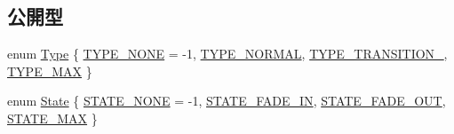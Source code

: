 \subsection*{公開型}
\begin{DoxyCompactItemize}
\item 
enum \mbox{\hyperlink{class_fade_ac06f27215b454aa05b93c236476d6e80}{Type}} \{ \mbox{\hyperlink{class_fade_ac06f27215b454aa05b93c236476d6e80aff416f0a20b074a38a4f67e20f001828}{T\+Y\+P\+E\+\_\+\+N\+O\+NE}} = -\/1, 
\mbox{\hyperlink{class_fade_ac06f27215b454aa05b93c236476d6e80a6058f5db637853756ba18166da96043e}{T\+Y\+P\+E\+\_\+\+N\+O\+R\+M\+AL}}, 
\mbox{\hyperlink{class_fade_ac06f27215b454aa05b93c236476d6e80af424897abd4b53f7af0bf51f1190a427}{T\+Y\+P\+E\+\_\+\+T\+R\+A\+N\+S\+I\+T\+I\+O\+N\+\_}}, 
\mbox{\hyperlink{class_fade_ac06f27215b454aa05b93c236476d6e80ab05e3987a6b16a8ebe7e284aa8922ea0}{T\+Y\+P\+E\+\_\+\+M\+AX}}
 \}
\item 
enum \mbox{\hyperlink{class_fade_ae77826bf3ff2ab95fb7b3b6f95cba80a}{State}} \{ \mbox{\hyperlink{class_fade_ae77826bf3ff2ab95fb7b3b6f95cba80aae593109007af793c6b0e7e287dcc7803}{S\+T\+A\+T\+E\+\_\+\+N\+O\+NE}} = -\/1, 
\mbox{\hyperlink{class_fade_ae77826bf3ff2ab95fb7b3b6f95cba80aa5b9862985db043392d465dd7a7a7805b}{S\+T\+A\+T\+E\+\_\+\+F\+A\+D\+E\+\_\+\+IN}}, 
\mbox{\hyperlink{class_fade_ae77826bf3ff2ab95fb7b3b6f95cba80aa41e3fdc3eb47279527440d923fccbb6e}{S\+T\+A\+T\+E\+\_\+\+F\+A\+D\+E\+\_\+\+O\+UT}}, 
\mbox{\hyperlink{class_fade_ae77826bf3ff2ab95fb7b3b6f95cba80aab65dcff35c00997ef90c43d254906121}{S\+T\+A\+T\+E\+\_\+\+M\+AX}}
 \}
\end{DoxyCompactItemize}
